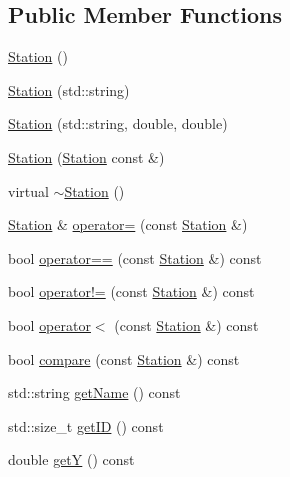 \subsection*{Public Member Functions}
\begin{DoxyCompactItemize}
\item 
\mbox{\hyperlink{classanen_sta_1_1_station_afb64bb9d68c519a693cd10af5d783873}{Station}} ()
\item 
\mbox{\hyperlink{classanen_sta_1_1_station_a388a35801b1bc978ac07f7a27ffcbfad}{Station}} (std\+::string)
\item 
\mbox{\hyperlink{classanen_sta_1_1_station_a1ebec6ab0f696fcbe3b2fdabf0e08410}{Station}} (std\+::string, double, double)
\item 
\mbox{\hyperlink{classanen_sta_1_1_station_abe94af374abbb791cfe572a2b165f10d}{Station}} (\mbox{\hyperlink{classanen_sta_1_1_station}{Station}} const \&)
\item 
virtual \mbox{\hyperlink{classanen_sta_1_1_station_a2825593117f648d73ea9cbaf851d709d}{$\sim$\+Station}} ()
\item 
\mbox{\hyperlink{classanen_sta_1_1_station}{Station}} \& \mbox{\hyperlink{classanen_sta_1_1_station_aefbe0460eb39098b3e1ed4b085ecefab}{operator=}} (const \mbox{\hyperlink{classanen_sta_1_1_station}{Station}} \&)
\item 
bool \mbox{\hyperlink{classanen_sta_1_1_station_a402c117d0cff0994d195c2b7027f57c6}{operator==}} (const \mbox{\hyperlink{classanen_sta_1_1_station}{Station}} \&) const
\item 
bool \mbox{\hyperlink{classanen_sta_1_1_station_a1d1825af1c6c219cebd12f836973159e}{operator!=}} (const \mbox{\hyperlink{classanen_sta_1_1_station}{Station}} \&) const
\item 
bool \mbox{\hyperlink{classanen_sta_1_1_station_ae75bae686937d9b5fc9b75ca7f6133fc}{operator$<$}} (const \mbox{\hyperlink{classanen_sta_1_1_station}{Station}} \&) const
\item 
bool \mbox{\hyperlink{classanen_sta_1_1_station_a071a6c089a2c00a61606d7b4e2766194}{compare}} (const \mbox{\hyperlink{classanen_sta_1_1_station}{Station}} \&) const
\item 
std\+::string \mbox{\hyperlink{classanen_sta_1_1_station_a85b26a617e15c4d516e06169c9fb9e50}{get\+Name}} () const
\item 
std\+::size\+\_\+t \mbox{\hyperlink{classanen_sta_1_1_station_a7da5e30ee0d25653333630aa61ca5257}{get\+ID}} () const
\item 
double \mbox{\hyperlink{classanen_sta_1_1_station_adefc7f1b643ef4542580fd05fbf96b60}{getY}} () const

\end{DoxyCompactItemize}
